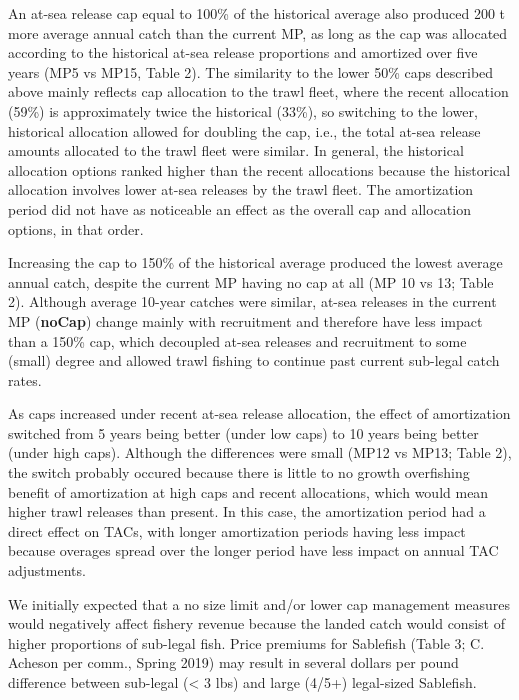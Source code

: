 \documentclass[11pt]{book}
\begin{document}
An at-sea release cap equal to 100\% of the historical average also produced 200 t more average annual catch than the current MP, as long as the cap was allocated according to the historical at-sea release proportions and amortized over five years (MP5 vs MP15, Table 2). The similarity to the lower 50\% caps described above mainly reflects cap allocation to the trawl fleet, where the recent allocation (59\%) is approximately twice the historical (33\%), so switching to the lower, historical allocation allowed for doubling the cap, i.e., the total at-sea release amounts allocated to the trawl fleet were similar. In general, the historical allocation options ranked higher than the recent allocations because the historical allocation involves lower at-sea releases by the trawl fleet. The amortization period did not have as noticeable an effect as the overall cap and allocation options, in that order.

Increasing the cap to 150\% of the historical average produced the lowest average annual catch, despite the current MP having no cap at all (MP 10 vs 13; Table 2). Although average 10-year catches were similar, at-sea releases in the current MP (\textbf{noCap}) change mainly with recruitment and therefore have less impact than a 150\% cap, which decoupled at-sea releases and recruitment to some (small) degree and allowed trawl fishing to continue past current sub-legal catch rates.

As caps increased under recent at-sea release allocation, the effect of amortization switched from 5 years being better (under low caps) to 10 years being better (under high caps). Although the differences were small (MP12 vs MP13; Table 2), the switch probably occured because there is little to no growth overfishing benefit of amortization at high caps and recent allocations, which would mean higher trawl releases than present. In this case, the amortization period had a direct effect on TACs, with longer amortization periods having less impact because overages spread over the longer period have less impact on annual TAC adjustments.

We initially expected that a no size limit and/or lower cap management measures would negatively affect fishery revenue because the landed catch would consist of higher proportions of sub-legal fish. Price premiums for Sablefish (Table 3; C. Acheson per comm., Spring 2019) may result in several dollars per pound difference between sub-legal (\textless{} 3 lbs) and large (4/5+) legal-sized Sablefish.
\end{document}

